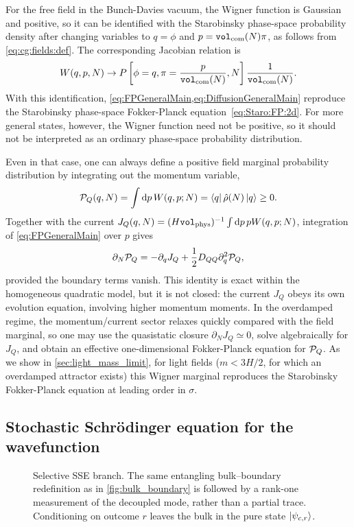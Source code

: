 \documentclass{article}
\newcommand{\VF}{\mathtt{vol}_{\rm com}}
\newcommand{\Vphys}{\mathtt{vol}_{\rm phys}}
\numberwithin{equation}{section}
\begin{document}
	For the free field in the Bunch-Davies vacuum, the Wigner function is Gaussian and positive, so it can be identified with the Starobinsky phase-space probability density after changing variables to \(q=\phi\) and \(p=\VF(N)\pi\), as follows from \cref{eq:cg:fields:def}. The corresponding Jacobian relation is
	\begin{equation}
	W(q,p,N)\to P\left[\phi=q,\pi=\frac{p}{\VF(N)},N\right]\frac{1}{\VF(N)} .
	\end{equation}
	With this identification, \cref{eq:FPGeneralMain,eq:DiffusionGeneralMain} reproduce the Starobinsky phase-space Fokker-Planck equation~\eqref{eq:Staro:FP:2d}. For more general states, however, the Wigner function need not be positive, so it should not be interpreted as an ordinary phase-space probability distribution.

	Even in that case, one can always define a positive field marginal probability distribution by integrating out the momentum variable,
	\begin{equation}
		{\cal P}_Q(q,N)=\int \dd p\,W(q,p;N)=\bra{q}\hat\rho(N)\ket{q}\geq0 .
	\end{equation}
	Together with the current \(J_Q(q,N)=(H\Vphys)^{-1}\int \dd p\,pW(q,p;N)\), integration of \cref{eq:FPGeneralMain} over \(p\) gives
	\begin{equation}
		\partial_N{\cal P}_Q=-\partial_qJ_Q+\frac12D_{QQ}\partial_q^2{\cal P}_Q ,
	\end{equation}
    provided the boundary terms vanish. This identity is exact within the homogeneous quadratic model, but it is not closed: the current \(J_Q\) obeys its own evolution equation, involving higher momentum moments. In the overdamped regime, the momentum/current sector relaxes quickly compared with the field marginal, so one may use the quasistatic closure \(\partial_N J_Q\simeq0\), solve algebraically for \(J_Q\), and obtain an effective one-dimensional Fokker-Planck equation for \({\cal P}_Q\). As we show in \cref{sec:light_mass_limit}, for light fields ($m<3H/2$, for which an overdamped attractor exists) this Wigner marginal reproduces the Starobinsky Fokker-Planck equation at leading order in $\sigma$.

	\subsection{Stochastic Schr\"odinger equation for the wavefunction}
    \label{sec:SSE}

    	\begin{figure}[ht]
		\centering
		
		\caption{\small Selective SSE branch. The same entangling bulk--boundary redefinition as in \cref{fig:bulk_boundary} is followed by a rank-one measurement of the decoupled mode, rather than a partial trace. Conditioning on outcome \(r\) leaves the bulk in the pure state \(\ket{\psi_{c,r}}\).}
		\label{fig:PureStatePOVM}
	\end{figure}
\end{document}
